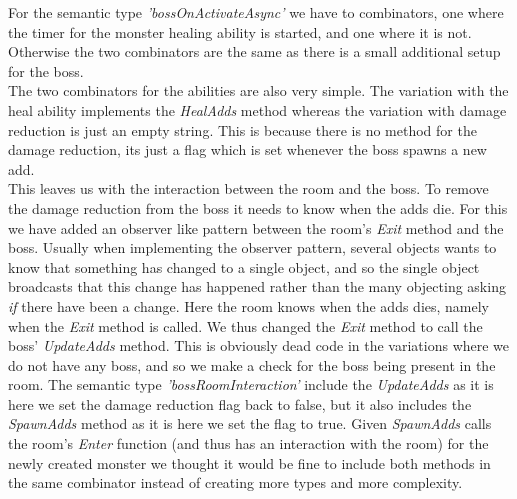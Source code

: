 For the semantic type \textit{'bossOnActivateAsync'} we have to combinators, one where the timer for the monster healing ability is started, and one where it is not. Otherwise the two combinators are the same as there is a small additional setup for the boss.\\
The two combinators for the abilities are also very simple. The variation with the heal ability implements the \textit{HealAdds} method whereas the variation with damage reduction is just an empty string. This is because there is no method for the damage reduction, its just a flag which is set whenever the boss spawns a new add.\\
This leaves us with the interaction between the room and the boss. To remove the damage reduction from the boss it needs to know when the adds die. For this we have added an observer like pattern between the room's \textit{Exit} method and the boss. Usually when implementing the observer pattern, several objects wants to know that something has changed to a single object, and so the single object broadcasts that this change has happened rather than the many objecting asking \textit{if} there have been a change. Here the room knows when the adds dies, namely when the \textit{Exit} method is called. We thus changed the \textit{Exit} method to call the boss' \textit{UpdateAdds} method. This is obviously dead code in the variations where we do not have any boss, and so we make a check for the boss being present in the room. The semantic type \textit{'bossRoomInteraction'} include the \textit{UpdateAdds} as it is here we set the damage reduction flag back to false, but it also includes the \textit{SpawnAdds} method as it is here we set the flag to true. Given \textit{SpawnAdds} calls the room's \textit{Enter} function (and thus has an interaction with the room) for the newly created monster we thought it would be fine to include both methods in the same combinator instead of creating more types and more complexity.\\

